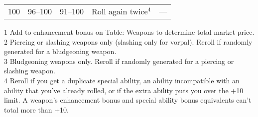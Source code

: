 \begin{table}[]
\begin{tabular}{lllll}
100 & 96–100 & 91–100 & Roll again twice\(^{4}\) & —\\
\end{tabular}
1 Add to enhancement bonus on Table: Weapons to determine total market price. \\
 2 Piercing or slashing weapons only (slashing only for vorpal). Reroll if randomly generated for a bludgeoning weapon. \\
 3 Bludgeoning weapons only. Reroll if randomly generated for a piercing or slashing weapon. \\
 4 Reroll if you get a duplicate special ability, an ability incompatible with an ability that you've already rolled, or if the extra ability puts you over the +10 limit. A weapon's enhancement bonus and special ability bonus equivalents can't total more than +10.\\
\end{table}
				
